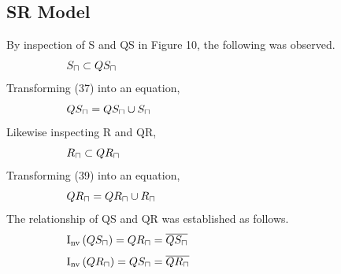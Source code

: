 \documentclass[10pt,journal]{IEEEtran}
\begin{document}
\subsection{SR Model}
By inspection of S and QS in Figure 10, the following was observed.
\begin{equation}
 \begin{minipage}{250pt}
\begin{flushleft} $\displaystyle S_{\sqcap} \subset QS_{\sqcap}$  \end{flushleft}
 \end{minipage}
 \end{equation}
Transforming (37) into an equation,
\begin{equation}
 \begin{minipage}{250pt}
\begin{flushleft} $\displaystyle QS_{\sqcap} = QS_{\sqcap}  \cup  S_{\sqcap}$  \end{flushleft}
 \end{minipage}
 \end{equation}
Likewise inspecting R and QR, 
\begin{equation}
 \begin{minipage}{250pt}
\begin{flushleft} $\displaystyle R_{\sqcap} \subset QR_{\sqcap}$  \end{flushleft}
 \end{minipage}
 \end{equation}
Transforming (39) into an equation,
\begin{equation}
 \begin{minipage}{250pt}
\begin{flushleft} $\displaystyle QR_{\sqcap} = QR_{\sqcap}  \cup  R_{\sqcap}$  \end{flushleft}
 \end{minipage}
 \end{equation}
The relationship of QS and QR was established as follows.
\begin{equation}
 \begin{minipage}{250pt}
\begin{flushleft} $\displaystyle \operatorname{I_{nv}}{\left(QS_{\sqcap} \right)} = QR_{\sqcap} = \overline{QS_{\sqcap}}$  \end{flushleft}
 \end{minipage}
 \end{equation}
\begin{equation}
 \begin{minipage}{250pt}
\begin{flushleft} $\displaystyle \operatorname{I_{nv}}{\left(QR_{\sqcap} \right)} = QS_{\sqcap} = \overline{QR_{\sqcap}}$  \end{flushleft}
 \end{minipage}
 \end{equation}
\end{document}
